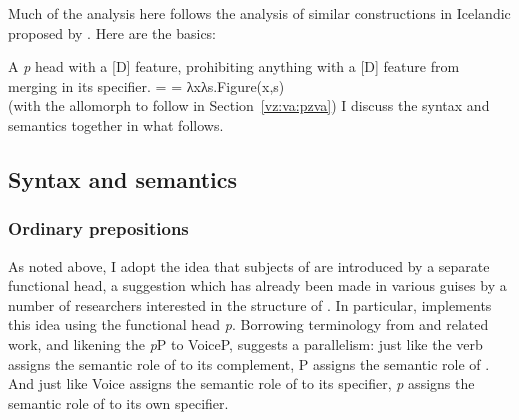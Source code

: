\begin{exe}
\begin{xlist}
\begin{xlist}
\begin{exe}
\begin{xlist}
\begin{xlist}
\begin{exe}
\begin{xlist}
\begin{xlist}
\begin{exe}
\begin{exe}
\begin{xlist}
\begin{exe}
\begin{exe}
\begin{xlist}
\begin{exe}
\begin{exe}
\begin{exe}
\begin{exe}
\begin{exe}
\begin{xlist}
\begin{exe}
\begin{xlist}
\begin{exe}
\begin{exe}
\begin{xlist}
\begin{exe}
\begin{xlist}
\begin{exe}
\begin{xlist}
\begin{exe}
\begin{exe}
\begin{exe}
\begin{xlist}
\begin{exe}
\begin{exe}
\begin{exe}
\begin{xlist}
\begin{exe}
\begin{xlist}
\begin{exe}
\begin{exe}
\begin{xlist}
\begin{exe}
\begin{exe}
\begin{exe}
\begin{exe}
\begin{xlist}
\begin{exe}
\begin{xlist}
Much of the analysis here follows the analysis of similar constructions in Icelandic proposed by \cite{wood15springer}. Here are the basics:

 \begin{exe}
 \ex  \pz
 \begin{xlist} 
 	\ex  A \textit{p} head with a [\textminus{}D] feature, prohibiting anything with a [D] feature from merging in its specifier. 
     \ex  \denote{\pz} =  = λxλs.Figure(x,s) 
 	\ex  {\pz} {\lra} {\tnif} \\ (with the allomorph {\thit} to follow in Section~\ref{vz:va:pzva}) 
 \z
\z 
I discuss the syntax and semantics together in what follows.

	\subsection{Syntax and semantics} \label{vz:pz:syn}	
		\subsubsection{Ordinary prepositions}\largerpage[2]
As noted above, I adopt the idea that subjects of  are introduced by a separate functional head, a suggestion which has already been made in various guises by a number of researchers interested in the structure of  \citep{vanriemsdijk90,rooryck96,koopman97,gehrke08phd,dendikken03,dendikken10}. In particular, \cite{svenonius03,svenonius07,svenonius10} implements this idea using the functional head \emph{p}. Borrowing terminology from \cite{talmy78} and related work, and likening the \emph{p}P to VoiceP, \cite{wood14nllt,wood15springer} suggests a parallelism: just like the verb assigns the semantic role of  to its complement, P assigns the semantic role of \textsc{}. And just like Voice assigns the semantic role of  to its specifier, \emph{p} assigns the semantic role of \textsc{} to its own specifier.


\end{xlist}
\end{exe}
\end{xlist}
\end{exe}
\end{xlist}
\end{exe}
\end{exe}
\end{exe}
\end{exe}
\end{xlist}
\end{exe}
\end{exe}
\end{xlist}
\end{exe}
\end{xlist}
\end{exe}
\end{exe}
\end{exe}
\end{xlist}
\end{exe}
\end{exe}
\end{exe}
\end{xlist}
\end{exe}
\end{xlist}
\end{exe}
\end{xlist}
\end{exe}
\end{exe}
\end{xlist}
\end{exe}
\end{xlist}
\end{exe}
\end{exe}
\end{exe}
\end{exe}
\end{exe}
\end{xlist}
\end{exe}
\end{exe}
\end{xlist}
\end{exe}
\end{exe}
\end{xlist}
\end{xlist}
\end{exe}
\end{xlist}
\end{xlist}
\end{exe}
\end{xlist}
\end{xlist}
\end{exe}
